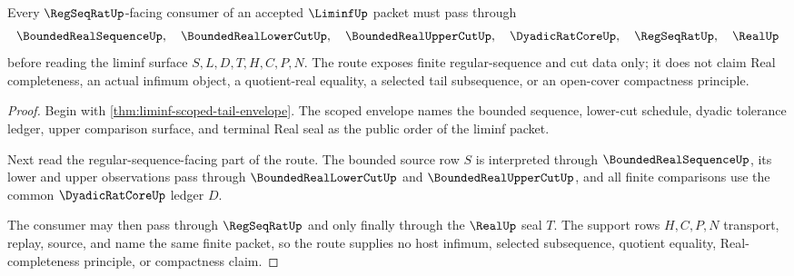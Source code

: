 \begin{theorem}
\label{thm:liminf-regular-sequence-route}
Every $\RegSeqRatUp$-facing consumer of an accepted $\LiminfUp$ packet must pass through
$$
\BoundedRealSequenceUp,\quad
\BoundedRealLowerCutUp,\quad
\BoundedRealUpperCutUp,\quad
\DyadicRatCoreUp,\quad
\RegSeqRatUp,\quad
\RealUp
$$
before reading the liminf surface $S,L,D,T,H,C,P,N$. The route exposes finite regular-sequence and cut data only; it does not claim Real completeness, an actual infimum object, a quotient-real equality, a selected tail subsequence, or an open-cover compactness principle.
\end{theorem}
\begin{proof}
Begin with \autoref{thm:liminf-scoped-tail-envelope}. The scoped envelope names the bounded sequence, lower-cut schedule, dyadic tolerance ledger, upper comparison surface, and terminal Real seal as the public order of the liminf packet.

Next read the regular-sequence-facing part of the route. The bounded source row $S$ is interpreted through $\BoundedRealSequenceUp$, its lower and upper observations pass through $\BoundedRealLowerCutUp$ and $\BoundedRealUpperCutUp$, and all finite comparisons use the common $\DyadicRatCoreUp$ ledger $D$.

The consumer may then pass through $\RegSeqRatUp$ and only finally through the $\RealUp$ seal $T$. The support rows $H,C,P,N$ transport, replay, source, and name the same finite packet, so the route supplies no host infimum, selected subsequence, quotient equality, Real-completeness principle, or compactness claim.
\end{proof}

\begin{closurestatus}{\LiminfUp}
  \theoryclosure{\publicClosure}
  \formalstatus{\unformalizedV}
\end{closurestatus}
